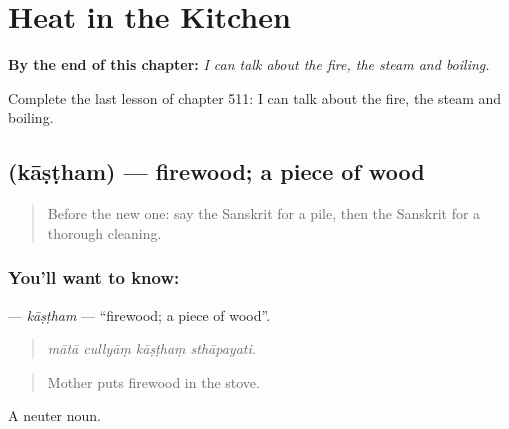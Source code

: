 
\chapter{Heat in the Kitchen}
\label{ch:sa-heat-in-the-kitchen}

\begin{chapteropening}
\textbf{By the end of this chapter:} \emph{I can talk about the fire, the steam and boiling.}

Complete the last lesson of chapter 511: I can talk about the fire, the steam and boiling.
\end{chapteropening}

\section[\texorpdfstring{\sk{काष्ठम्} (kāṣṭham)}{काष्ठम् (kāṣṭham)}]{ (kāṣṭham) — firewood; a piece of wood}

\label{lesson:SA-C511-kastham}



\begin{quote}
Before the new one: say the Sanskrit for a pile, then the Sanskrit for a thorough cleaning.
\end{quote}

\subsection*{You'll want to know: }
\textbf{} — \emph{kāṣṭham} — \textquotedblleft{}firewood; a piece of wood\textquotedblright{}.

\begin{quote}
   
\end{quote}

\begin{quote}
\emph{mātā cullyāṃ kāṣṭhaṃ sthāpayati.}
\end{quote}

\begin{quote}
Mother puts firewood in the stove.
\end{quote}

A neuter noun.

